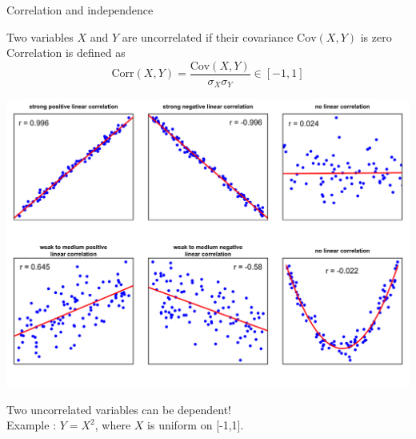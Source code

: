 \documentclass{beamer}
\begin{document}
\begin{frame}{Correlation and independence}

Two variables $X$ and $Y$ are uncorrelated if their covariance $\textrm{Cov}(X,Y)$ is zero
\\
\vspace{0.2cm}
Correlation is defined as 
\begin{equation*}
\textrm{Corr}(X,Y) = \frac{\textrm{Cov}(X,Y)}{\sigma_{X}\sigma_{Y}} \in [-1,1]
\end{equation*}
\begin{center}
\includegraphics[scale=0.14]{correlation.png}
\end{center}
\vspace{-0.3cm}
Two uncorrelated variables can be dependent!\\ Example : $Y = X^2$, where $X$ is uniform on [-1,1].\\
\end{frame}
\end{document}
